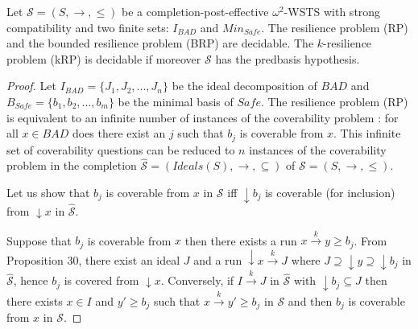 \begin{proposition}\label{down-up}
Let $\mathscr{S}=(S,\rightarrow, \leq)$ be a completion-post-effective $\omega^2$-WSTS with strong compatibility and two finite sets: $I_{BAD}$ and $Min_{Safe}$.
The %
resilience problem (RP) and the %
bounded resilience problem (BRP) are decidable.
The %
 $k$-resilience problem (kRP) is decidable if moreover $\mathscr{S}$ has the predbasis hypothesis.
\end{proposition}

\begin{proof}
Let $I_{BAD}=\{J_1, J_2,...,J_n\}$ be the ideal decomposition of $BAD$ and $B_{Safe}=\{b_1,b_2,...,b_m\}$ be the minimal basis of $Safe$.
The %
resilience problem (RP) is equivalent to an infinite number of instances of the coverability problem : for all $x \in BAD$ does there exist an $j$ such that $b_j$ is coverable from $x$. This infinite set of coverability questions can be reduced to $n$ instances of the coverability problem in the completion $\hat{\mathscr{S}}=(Ideals(S),\rightarrow, \subseteq)$ of $\mathscr{S}=(S,\rightarrow, \leq)$.


Let us show that $b_j$ is coverable from $x$ in $\mathscr{S}$ iff $\downarrow b_j$ is coverable (for inclusion) from $\downarrow x$ in $\hat{\mathscr{S}}$.

Suppose that $b_j$ is coverable from $x$ then there exists a run $x \xrightarrow{k} y \geq b_j$. From Proposition 30, there exist an ideal $J$ and a run $\downarrow x \xrightarrow{k} J$ where $J \supseteq \downarrow y \supseteq \downarrow b_j$ in $\hat{\mathscr{S}}$, hence $b_j$ is covered from $\downarrow x$.
Conversely, if $I \xrightarrow{k} J$ in $\hat{\mathscr{S}}$ with $\downarrow b_j \subseteq J$ then 
there exists $x \in I$ and $y' \geq b_j$ such that $x \xrightarrow{k} y'  \geq b_j$ in $\mathscr{S}$ and then $b_j$ is coverable from $x$ in $\mathscr{S}$.


\end{proof}
